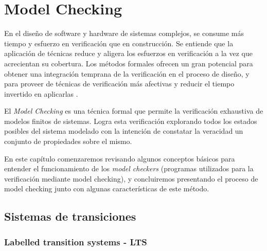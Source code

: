 \documentclass[titlepage, 12pt]{book}
\begin{document}





\chapter{Model Checking}
\label{CapMC}

En el dise\~no de software y hardware de sistemas complejos, se consume m\'as tiempo y esfuerzo en verificaci\'on que en construcci\'on. Se entiende que la aplicaci\'on de t\'ecnicas reduce y aligera los esfuerzos en verificaci\'on a la vez que acrecientan su cobertura. Los m\'etodos formales ofrecen un gran potencial para obtener una integraci\'on temprana de la verificaci\'on en el proceso de dise\~no, y para proveer de t\'ecnicas de verificaci\'on m\'as afectivas y reducir el tiempo invertido en aplicarlas \cite{prinMC}.

El \textit{Model Checking} es una t\'ecnica formal que permite la verificaci\'on exhaustiva de modelos finitos de sistemas. Logra esta verificaci\'on explorando todos los estados posibles del sistema modelado con la intenci\'on de constatar la veracidad un conjunto de propiedades sobre el mismo.

En este cap\'itulo comenzaremos revisando algunos conceptos b\'asicos para entender el funcionamiento de los \textit{model checkers} (programas utilizados para la verificaci\'on mediante model checking), y concluiremos presentando el proceso de model checking junto con algunas caracter\'isticas de este m\'etodo.









\section{Sistemas de transiciones}
\label{LTSaK}

\subsection*{Labelled transition systems - LTS}
\end{document}
